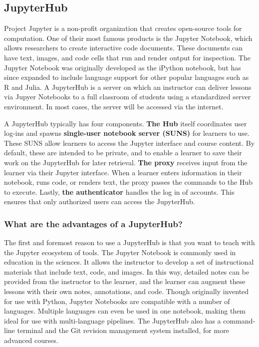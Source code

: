 \subsection{JupyterHub}\label{JupyterHub}

Project Jupyter is a non-profit organization that creates open-source tools for computation.
One of their most famous products is the Jupyter Notebook, which allows researchers to create interactive code documents.
These documents can have text, images, and code cells that run and render output for inspection.
The Jupyter Notebook was originally developed as the iPython notebook, but has since expanded to include language support for other popular languages such as R and Julia.
A JupyterHub is a server on which an instructor can deliver lessons via Jupyer Notebooks to a full classroom of students using a standardized server environment.
In most cases, the server will be accessed via the internet.

A JupyterHub typically has four components. 
\textbf{The Hub} itself coordinates user log-ins and spawns \textbf{single-user notebook server (SUNS)} for learners to use.
These SUNS allow learners to access the Jupyter interface and course content.
By default, these are intended to be private, and to enable a learner to save their work on the JupyterHub for later retrieval. 
\textbf{The proxy} receives input from the learner via their Jupyter interface. 
When a learner enters information in their notebook, runs code, or renders text, the proxy passes the commands to the Hub to execute. 
Lastly, \textbf{the authenticator} handles the log in of accounts.
This ensures that only authorized users can access the JupyterHub. 

\subsubsection{What are the advantages of a JupyterHub?}

The first and foremost reason to use a JupyterHub is that you want to teach with the Jupyter ecosystem of tools.
The Jupyter Notebook is commonly used in education in the sciences.
It allows the instructor to develop a set of instructional materials that include text, code, and images.
In this way, detailed notes can be provided from the instructor to the learner, and the learner can augment these lessons with their own notes, annotations, and code.
Though originally invented for use with Python, Jupyter Notebooks are compatible with a number of languages.
Multiple languages can even be used in one notebook, making them ideal for use with multi-language pipelines.
The JupyterHub also has a command-line terminal and the Git revision management system installed, for more advanced courses.

